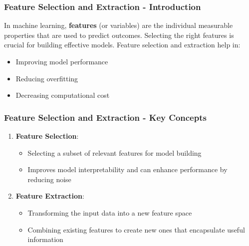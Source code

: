 \documentclass[aspectratio=169]{beamer}
\begin{document}
\begin{frame}[fragile]
    \frametitle{Feature Selection and Extraction - Introduction}
    In machine learning, \textbf{features} (or variables) are the individual measurable properties that are used to predict outcomes. Selecting the right features is crucial for building effective models. Feature selection and extraction help in:
    \begin{itemize}
        \item Improving model performance
        \item Reducing overfitting
        \item Decreasing computational cost
    \end{itemize}
\end{frame}

\begin{frame}[fragile]
    \frametitle{Feature Selection and Extraction - Key Concepts}
    \begin{enumerate}
        \item \textbf{Feature Selection}:
        \begin{itemize}
            \item Selecting a subset of relevant features for model building
            \item Improves model interpretability and can enhance performance by reducing noise
        \end{itemize}
        
        \item \textbf{Feature Extraction}:
        \begin{itemize}
            \item Transforming the input data into a new feature space
            \item Combining existing features to create new ones that encapsulate useful information
        \end{itemize}
    \end{enumerate}
\end{frame}
\end{document}
